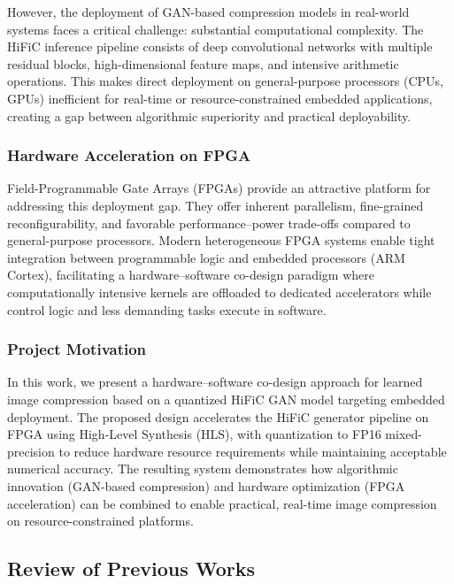 However, the deployment of GAN-based compression models in real-world systems faces a critical challenge: substantial computational complexity. The HiFiC inference pipeline consists of deep convolutional networks with multiple residual blocks, high-dimensional feature maps, and intensive arithmetic operations. This makes direct deployment on general-purpose processors (CPUs, GPUs) inefficient for real-time or resource-constrained embedded applications, creating a gap between algorithmic superiority and practical deployability.

\subsubsection*{Hardware Acceleration on FPGA}

Field-Programmable Gate Arrays (FPGAs) provide an attractive platform for addressing this deployment gap. They offer inherent parallelism, fine-grained reconfigurability, and favorable performance--power trade-offs compared to general-purpose processors. Modern heterogeneous FPGA systems enable tight integration between programmable logic and embedded processors (ARM Cortex), facilitating a hardware--software co-design paradigm where computationally intensive kernels are offloaded to dedicated accelerators while control logic and less demanding tasks execute in software.

\subsubsection*{Project Motivation}

In this work, we present a hardware--software co-design approach for learned image compression based on a quantized HiFiC GAN model targeting embedded deployment. The proposed design accelerates the HiFiC generator pipeline on FPGA using High-Level Synthesis (HLS), with quantization to FP16 mixed-precision to reduce hardware resource requirements while maintaining acceptable numerical accuracy. The resulting system demonstrates how algorithmic innovation (GAN-based compression) and hardware optimization (FPGA acceleration) can be combined to enable practical, real-time image compression on resource-constrained platforms.

\subsection{Review of Previous Works}

